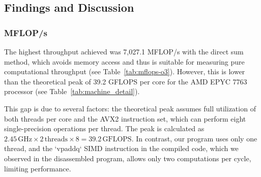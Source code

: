 \subsection{Findings and Discussion}




\subsubsection{MFLOP/s}

The highest throughput achieved was 7,027.1 MFLOP/s with the direct sum method, which avoids memory access and thus is suitable for measuring pure computational throughput (see Table~\ref{tab:mflops-o3}). However, this is lower than the theoretical peak of 39.2 GFLOPS per core for the AMD EPYC 7763 processor (see Table~\ref{tab:machine_detail}).

This gap is due to several factors: the theoretical peak assumes full utilization of both threads per core and the AVX2 instruction set, which can perform eight single-precision operations per thread. The peak is calculated as \(2.45 \, \text{GHz} \times 2 \, \text{threads} \times 8 = 39.2 \, \text{GFLOPS}\). In contrast, our program uses only one thread, and the `vpaddq` SIMD instruction in the compiled code, which we observed in the disassembled program, allows only two computations per cycle, limiting performance.

